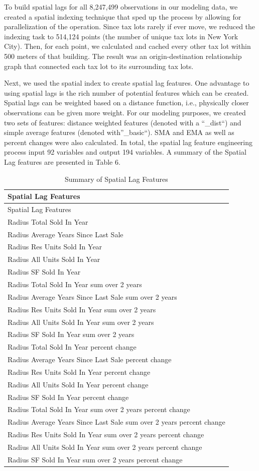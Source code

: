 \documentclass[12pt,]{article}
\begin{document}
To build spatial lags for all 8,247,499 observations in our modeling
data, we created a spatial indexing technique that sped up the process
by allowing for parallelization of the operation. Since tax lots rarely
if ever move, we reduced the indexing task to 514,124 points (the number
of unique tax lots in New York City). Then, for each point, we
calculated and cached every other tax lot within 500 meters of that
building. The result was an origin-destination relationship graph that
connected each tax lot to its surrounding tax lots.

Next, we used the spatial index to create spatial lag features. One
advantage to using spatial lags is the rich number of potential features
which can be created. Spatial lags can be weighted based on a distance
function, i.e., physically closer observations can be given more weight.
For our modeling purposes, we created two sets of features: distance
weighted features (denoted with a ``\_dist``) and simple average
features (denoted with''\_basic``). SMA and EMA as well as percent
changes were also calculated. In total, the spatial lag feature
engineering process input 92 variables and output 194 variables. A
summary of the Spatial Lag features are presented in Table 6.

\begin{longtable}[]{@{}l@{}}
\caption{Summary of Spatial Lag Features}\tabularnewline
\toprule
Spatial Lag Features\tabularnewline
\midrule
\endfirsthead
\toprule
Spatial Lag Features\tabularnewline
\midrule
\endhead
Radius Total Sold In Year\tabularnewline
Radius Average Years Since Last Sale\tabularnewline
Radius Res Units Sold In Year\tabularnewline
Radius All Units Sold In Year\tabularnewline
Radius SF Sold In Year\tabularnewline
Radius Total Sold In Year sum over 2 years\tabularnewline
Radius Average Years Since Last Sale sum over 2 years\tabularnewline
Radius Res Units Sold In Year sum over 2 years\tabularnewline
Radius All Units Sold In Year sum over 2 years\tabularnewline
Radius SF Sold In Year sum over 2 years\tabularnewline
Radius Total Sold In Year percent change\tabularnewline
Radius Average Years Since Last Sale percent change\tabularnewline
Radius Res Units Sold In Year percent change\tabularnewline
Radius All Units Sold In Year percent change\tabularnewline
Radius SF Sold In Year percent change\tabularnewline
Radius Total Sold In Year sum over 2 years percent change\tabularnewline
Radius Average Years Since Last Sale sum over 2 years percent
change\tabularnewline
Radius Res Units Sold In Year sum over 2 years percent
change\tabularnewline
Radius All Units Sold In Year sum over 2 years percent
change\tabularnewline
Radius SF Sold In Year sum over 2 years percent change\tabularnewline
\bottomrule
\end{longtable}
\end{document}
